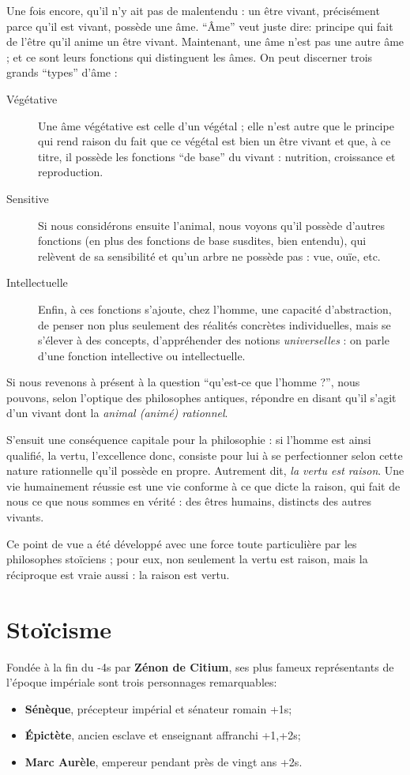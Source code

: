 \documentclass[11pt,a4paper]{article} %
\begin{document}
Une fois encore, qu'il n'y ait pas de malentendu : un être vivant, précisément parce qu'il
est vivant, possède une âme. ``\^Ame'' veut juste dire: principe qui fait de l'être qu'il anime un
être vivant. Maintenant, une âme n'est pas une autre âme ; et ce sont leurs fonctions qui
distinguent les âmes. On peut discerner trois grands ``types'' d'âme :
\begin{description}
	\item [Végétative]
		Une âme végétative est celle d'un végétal ; elle n'est autre que le principe qui rend raison
		du fait que ce végétal est bien un être vivant et que, à ce titre, il possède les fonctions ``de
		base'' du vivant : nutrition, croissance et reproduction.
	\item [Sensitive]
		Si nous considérons ensuite
		l'animal, nous voyons qu'il possède d'autres fonctions (en plus des fonctions de base susdites, bien entendu), qui relèvent de sa sensibilité et qu'un arbre ne possède pas : vue,
		ouïe, etc.
	\item [Intellectuelle]
		Enfin, à ces fonctions s'ajoute, chez l'homme, une capacité d'abstraction, de
		penser non plus seulement des réalités concrètes individuelles, mais se s'élever à des
		concepts, d'appréhender des notions \textit{universelles} : on parle d'une fonction intellective ou
		intellectuelle.
\end{description}

Si nous revenons à présent à la question ``qu'est-ce que l'homme ?'', nous pouvons, selon l'optique des philosophes antiques, répondre en disant qu'il s'agit d'un vivant dont la \textit{animal (animé) rationnel}.

S'ensuit une conséquence capitale pour la philosophie : si l'homme est ainsi qualifié, la
vertu, l'excellence donc, consiste pour lui à se perfectionner selon cette nature rationnelle
qu'il possède en propre. Autrement dit, \textit{la vertu est raison}.
Une vie humainement réussie
est une vie conforme à ce que dicte la raison, qui fait de nous ce que nous sommes en vérité : des êtres humains, distincts des autres vivants.

Ce point de vue a été développé avec une force
toute particulière par les philosophes stoïciens ; pour eux, non seulement la vertu est raison, mais la réciproque est vraie aussi : la raison est vertu.

\section{Stoïcisme}
Fondée à la fin du -4s par \textbf{Zénon de Citium}, ses plus fameux représentants de l'époque
impériale sont trois personnages remarquables:
\begin{itemize}
	\item \textbf{Sénèque}, précepteur impérial et sénateur romain +1s;
	\item \textbf{Épictète}, ancien esclave et enseignant affranchi +1,+2s;
	\item \textbf{Marc Aurèle}, empereur pendant près de vingt ans +2s.
\end{itemize}
\end{document}
